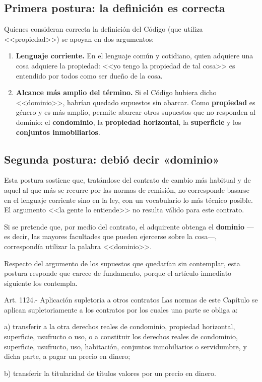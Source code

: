 \documentclass[12pt,oneside]{book}
\begin{document}
\subsection{Primera postura: la definición es correcta}

Quienes consideran correcta la definición del Código (que utiliza <<propiedad>>) se apoyan en dos argumentos:

\begin{enumerate}
    \item \textbf{Lenguaje corriente.} En el lenguaje común y cotidiano, quien adquiere una cosa adquiere la propiedad: <<yo tengo la propiedad de tal cosa>> es entendido por todos como ser dueño de la cosa.
    \item \textbf{Alcance más amplio del término.} Si el Código hubiera dicho <<dominio>>, habrían quedado supuestos sin abarcar. Como \textbf{propiedad} es género y es más amplio, permite abarcar otros supuestos que no responden al dominio: el \textbf{condominio}, la \textbf{propiedad horizontal}, la \textbf{superficie} y los \textbf{conjuntos inmobiliarios}.
\end{enumerate}

\subsection{Segunda postura: debió decir «dominio»}

Esta postura sostiene que, tratándose del contrato de cambio más habitual y de aquel al que más se recurre por las normas de remisión, no corresponde basarse en el lenguaje corriente sino en la ley, con un vocabulario lo más técnico posible. El argumento <<la gente lo entiende>> no resulta válido para este contrato.

Si se pretende que, por medio del contrato, el adquirente obtenga el \textbf{dominio} ---es decir, las mayores facultades que pueden ejercerse sobre la cosa---, correspondía utilizar la palabra <<dominio>>.

Respecto del argumento de los supuestos que quedarían sin contemplar, esta postura responde que carece de fundamento, porque el artículo inmediato siguiente los contempla.

\begin{norma}{Art. 1124.- Aplicación supletoria a otros contratos}
Las normas de este Capítulo se aplican supletoriamente a los contratos por los cuales una parte se obliga a:

a) transferir a la otra derechos reales de condominio, propiedad horizontal, superficie, usufructo o uso, o a constituir los derechos reales de condominio, superficie, usufructo, uso, habitación, conjuntos inmobiliarios o servidumbre, y dicha parte, a pagar un precio en dinero;

b) transferir la titularidad de títulos valores por un precio en dinero.
\end{norma}
\end{document}
